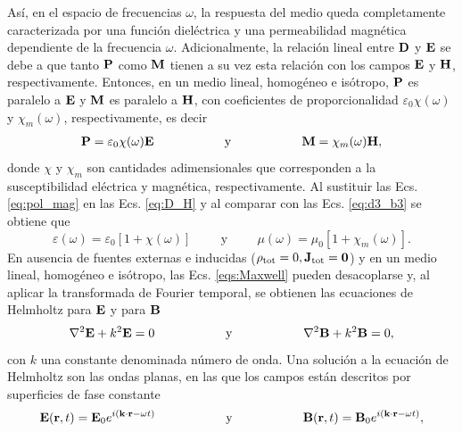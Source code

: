%
\noindent Así, en el espacio de frecuencias $\omega$, la respuesta del medio queda completamente caracterizada por una función dieléctrica y una permeabilidad magnética dependiente de la frecuencia $\omega$. Adicionalmente, la relación lineal entre $\vb{D}$ y $\vb{E}$ se debe a que tanto $\vb{P}$  como  $\vb{M}$ tienen a su vez esta relación con los campos $\vb{E}$ y $\vb{H}$, respectivamente. Entonces, en un medio lineal, homogéneo e isótropo, $\vb{P}$ es paralelo a 
 $\vb{E}$ y $\vb{M}$ es paralelo a $\vb{H}$, con coeficientes de proporcionalidad $\varepsilon_0 \chi(\omega)$ y $\chi_m(\omega)$, respectivamente, es decir \cite{griffithsIntroductionElectrodynamics2023}
\begin{align}
	\vb{P}=\varepsilon_0\chi(\omega)\vb{E}\hspace{2cm}\text{y}\hspace{2cm}
	\vb{M}=\chi_m(\omega)\vb{H},
	\label{eq:pol_mag}
\end{align}
%
donde $\chi$ y $\chi_m$ son cantidades adimensionales que corresponden a la susceptibilidad eléctrica y magnética, respectivamente. Al sustituir las Ecs. \eqref{eq:pol_mag} en las Ecs. \eqref{eq:D_H} y al comparar con las Ecs. \eqref{eq:d3_b3} se obtiene que
%
\begin{equation}
	\varepsilon(\omega)=\varepsilon_0[1+\chi(\omega)]\hspace{1cm}\text{y}\hspace{1cm}	\mu(\omega)=\mu_0[1+\chi_m(\omega)].
\end{equation}
%
En ausencia de fuentes externas e inducidas ($ \rho_{\text{tot}} = 0, \vb{J}_{\text{tot}} = \vb{0}$) y en un medio lineal, homogéneo e isótropo, las Ecs. \eqref{eqs:Maxwell} pueden desacoplarse y, al aplicar la transformada de Fourier temporal, se obtienen las ecuaciones de Helmholtz para $\vb{E}$ y para $\vb{B}$ \cite{jacksonClassicalElectrodynamics2021}
%
\begin{equation}
	\laplacian{\vb{E}}+k^2\vb{E}=0\hspace{2cm}\text{y}\hspace{2cm} \laplacian{\vb{B}}+k^2\vb{B}=0,
	\label{eqs:helmholtz}
\end{equation}
%
con $k$ una constante denominada número de onda. Una solución a la ecuación de Helmholtz son las ondas planas, en las que los campos están descritos por superficies de fase constante \cite{griffithsIntroductionElectrodynamics2023}
%
\begin{equation}
	\vb{E}(\vb{r},t) =\vb{E}_0 e^{i(\vb{k}\cdot\vb{r} -\omega t)}\hspace{2cm}\text{y}\hspace{2cm} \vb{B}(\vb{r}, t) =\vb{B}_0 e^{i(\vb{k}\cdot\vb{r} -\omega t)},	
	\label{eqs:ondas_planas}
\end{equation}
